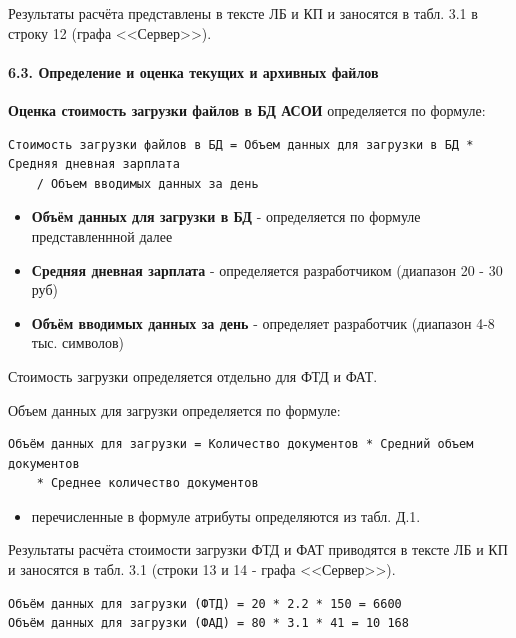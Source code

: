 \documentclass[12pt, a4paper, simple]{eskdtext}
\begin{document}
    Результаты расчёта представлены в тексте ЛБ и КП и заносятся в табл. 3.1 в строку 12 (графа <<Сервер>>).

    \paragraph{6.3. Определение и оценка текущих и архивных файлов} \hspace{0pt}

    \textbf{Оценка стоимость загрузки файлов в БД АСОИ} определяется по формуле:

    \begin{lstlisting}[language=Formula]
Стоимость загрузки файлов в БД = Объем данных для загрузки в БД * Средняя дневная зарплата
    / Объем вводимых данных за день
\end{lstlisting}

    \begin{itemize}
        \item \textbf{Объём данных для загрузки в БД} - определяется по формуле представленнной далее
        \item \textbf{Средняя дневная зарплата} - определяется разработчиком (диапазон 20 - 30 руб)
        \item \textbf{Объём вводимых данных за день} - определяет разработчик (диапазон 4-8 тыс. символов)
    \end{itemize}    

    Стоимость загрузки определяется отдельно для ФТД и ФАТ.

    Объем данных для загрузки определяется по формуле:

    \begin{lstlisting}[language=Formula]
Объём данных для загрузки = Количество документов * Средний объем документов
    * Среднее количество документов
\end{lstlisting}

    \begin{itemize}
        \item перечисленные в формуле атрибуты определяются из табл. Д.1.
    \end{itemize} 

    Результаты расчёта стоимости загрузки ФТД и ФАТ приводятся в тексте ЛБ и КП и заносятся в табл. 3.1
    (строки 13 и 14 - графа <<Сервер>>).
    
    \begin{lstlisting}[language=MyFormula]
Объём данных для загрузки (ФТД) = 20 * 2.2 * 150 = 6600
Объём данных для загрузки (ФАД) = 80 * 3.1 * 41 = 10 168
\end{lstlisting}
\end{document}
